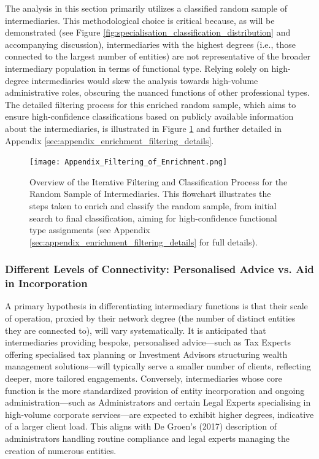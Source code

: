 The analysis in this section primarily utilizes a classified random sample of intermediaries. This methodological choice is critical because, as will be demonstrated (see Figure \ref{fig:specialisation_classification_distribution} and accompanying discussion), intermediaries with the highest degrees (i.e., those connected to the largest number of entities) are not representative of the broader intermediary population in terms of functional type. Relying solely on high-degree intermediaries would skew the analysis towards high-volume administrative roles, obscuring the nuanced functions of other professional types. The detailed filtering process for this enriched random sample, which aims to ensure high-confidence classifications based on publicly available information about the intermediaries, is illustrated in Figure \ref{fig:appendix_filtering_enrichment} and further detailed in Appendix \ref{sec:appendix_enrichment_filtering_details}.

\begin{figure}[htbp]
    \centering
    \texttt{[image: Appendix\_Filtering\_of\_Enrichment.png]}
    \caption{Overview of the Iterative Filtering and Classification Process for the Random Sample of Intermediaries. This flowchart illustrates the steps taken to enrich and classify the random sample, from initial search to final classification, aiming for high-confidence functional type assignments (see Appendix \ref{sec:appendix_enrichment_filtering_details} for full details).}
    \label{fig:appendix_filtering_enrichment}
\end{figure}

\subsubsection{Different Levels of Connectivity: Personalised Advice vs. Aid in Incorporation}
\label{subsubsec:connectivity_functional}

A primary hypothesis in differentiating intermediary functions is that their scale of operation, proxied by their network degree (the number of distinct entities they are connected to), will vary systematically. It is anticipated that intermediaries providing bespoke, personalised advice—such as Tax Experts offering specialised tax planning or Investment Advisors structuring wealth management solutions—will typically serve a smaller number of clients, reflecting deeper, more tailored engagements. Conversely, intermediaries whose core function is the more standardized provision of entity incorporation and ongoing administration—such as Administrators and certain Legal Experts specialising in high-volume corporate services—are expected to exhibit higher degrees, indicative of a larger client load. This aligns with De Groen's (2017) description of administrators handling routine compliance and legal experts managing the creation of numerous entities.

